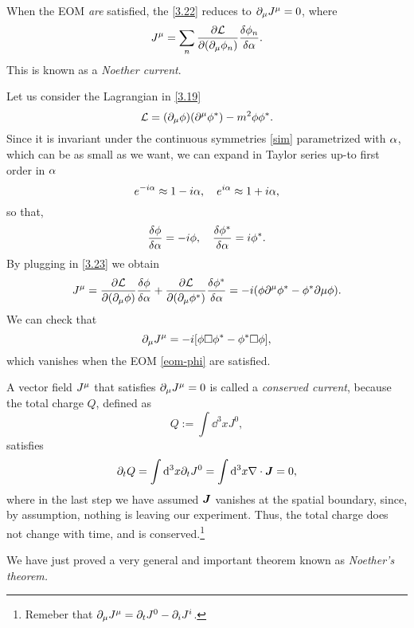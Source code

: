 When the EOM \textit{are} satisfied, the \eqref{3.22} reduces to $\partial_\mu J^\mu=0$, where
\begin{equation}\label{3.23}
	J^\mu =\sum_n\pdv{\mathcal{L}}{(\partial_\mu\phi_n )}\frac{\delta\phi_n }{\delta\alpha }.
\end{equation}
This is known as a \textit{Noether current}.

\begin{ej}
	Let us consider the Lagrangian in \eqref{3.19}
	\begin{equation}
   \mathcal{L} =(\partial_\mu\phi )(\partial^\mu \phi^*)-m^2\phi\phi^*.
\end{equation}
Since it is invariant under the continuous symmetries \eqref{sim} parametrized with $\alpha$, which can be as small as we want, we can expand in Taylor series up-to first order in $\alpha$
\begin{equation}
  e^{-i\alpha }\approx 1-i\alpha ,\quad e^{i\alpha }\approx 1+i\alpha,
\end{equation}
so that,
\begin{equation}
  \frac{\delta\phi }{\delta\alpha }=-i\phi ,\quad \frac{\delta\phi^*}{\delta\alpha }=i\phi^*.
\end{equation}
By plugging in \eqref{3.23} we obtain
\begin{equation}
  J^\mu =\pdv{\mathcal{L}}{(\partial_\mu\phi)}\frac{\delta\phi }{\delta\alpha }+\pdv{\mathcal{L}}{(\partial_\mu\phi^* )}\frac{\delta\phi^* }{\delta\alpha }=-i(\phi\partial^\mu \phi^*-\phi^*\partial\mu \phi ).
\end{equation}
We can check that
\begin{equation}
  \partial_\mu J^\mu =-i[\phi\Box \phi^*-\phi^*\Box\phi ],
\end{equation}
which vanishes when the EOM \eqref{eom-phi} are satisfied.
\end{ej}

A vector field $J^\mu $ that satisfies $\partial_\mu J^\mu =0$ is called a \textit{conserved current}, because the total charge $Q$, defined as
\begin{equation}
  Q:=\int \dd^3x J^0,
\end{equation}
satisfies 
\begin{equation}
  \partial_tQ=\int\dd^3x\partial_t J^0=\int\dd^3x\nabla\cdot\vb*{J}=0,
\end{equation}
where in the last step we have assumed $\vb*{J}$ vanishes at the spatial boundary, since, by assumption, nothing is leaving our experiment. Thus, the total charge does not change with time, and is conserved.\footnote{Remeber that $\partial_\mu J^\mu =\partial_t J^0 - \partial_i J^{i}$.}

We have just proved a very general and important theorem known as \textit{Noether's theorem.}

